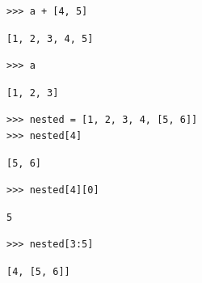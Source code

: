\begin{blocksection}
\begin{lstlisting}
>>> a + [4, 5]
\end{lstlisting}
\begin{solution}[.25in]
\begin{lstlisting}
[1, 2, 3, 4, 5]
\end{lstlisting}
\end{solution}
\end{blocksection}

\begin{blocksection}
\begin{lstlisting}
>>> a
\end{lstlisting}
\begin{solution}[.25in]
\begin{lstlisting}
[1, 2, 3]
\end{lstlisting}
\end{solution}
\end{blocksection}

\begin{blocksection}
\begin{lstlisting}
>>> nested = [1, 2, 3, 4, [5, 6]]
>>> nested[4]
\end{lstlisting}
\begin{solution}[.25in]
\begin{lstlisting}
[5, 6]
\end{lstlisting}
\end{solution}
\end{blocksection}

\begin{blocksection}
\begin{lstlisting}
>>> nested[4][0]
\end{lstlisting}
\begin{solution}[.25in]
\begin{lstlisting}
5
\end{lstlisting}
\end{solution}
\end{blocksection}

\begin{blocksection}
\begin{lstlisting}
>>> nested[3:5]
\end{lstlisting}
\begin{solution}[.25in]
\begin{lstlisting}
[4, [5, 6]]
\end{lstlisting}
\end{solution}
\end{blocksection}

